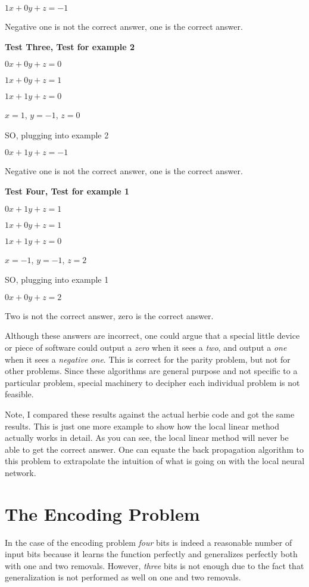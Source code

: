 	$1x + 0y + z = -1$    

 Negative one is not the correct answer, one is the correct answer.

 {\bf Test Three, Test for example 2}

	$0x + 0y + z = 0$

	$1x + 0y + z = 1$
     
	$1x + 1y + z = 0$

	$x = 1$, $y = -1$,  $z = 0$

	SO, plugging into example 2

	$0x + 1y + z = -1$    

 Negative one is not the correct answer, one is the correct answer.

 {\bf Test Four, Test for example 1}

	$0x + 1y + z = 1$

	$1x + 0y + z = 1$
    
	$1x + 1y + z = 0$

	$x = -1$,  $y = -1$,  $z = 2$

	SO, plugging into example 1

	$0x + 0y + z = 2$     

 Two is not the correct answer, zero is the correct answer.

	Although these answers are incorrect, one could argue that a
special little device or piece of software could output a {\it zero}
when it sees a {\it two}, and output a {\it one} when it sees a {\it
negative one}.  This is correct for the parity problem, but not for
other problems.  Since these algorithms are general purpose and not
specific to a particular problem, special machinery to decipher each
individual problem is not feasible.

	Note, I compared these results against the actual herbie code
and got the same results.  This is just one more example to show how
the local linear method actually works in detail.  As you can see, the
local linear method will never be able to get the correct answer.  One
can equate the back propagation algorithm to this problem to
extrapolate the intuition of what is going on with the local neural
network. 

\section{The Encoding Problem}

	In the case of the encoding problem {\it four} bits is indeed
a reasonable number of input bits because it learns the function
perfectly and generalizes perfectly both with one and two removals.
However, {\it three} bits is not enough due to the fact that
generalization is not performed as well on one and two removals.

